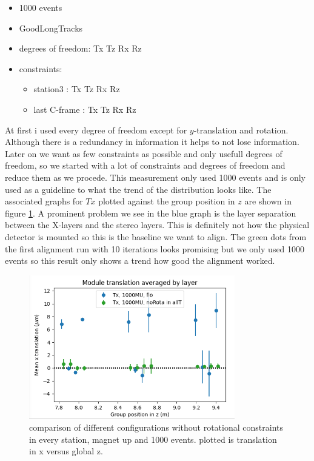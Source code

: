 \begin{itemize}
  \item 1000 events
  \item GoodLongTracks
  \item degrees of freedom: Tx Tz Rx Rz
  \item constraints:
  \begin{itemize}
    \item station3 : Tx Tz Rx Rz
    \item last C-frame : Tx Tz Rx Rz
  \end{itemize}
\end{itemize}

At first i used every degree of freedom except for $y$-translation and rotation. Although there is a redundancy in information it helps to not lose information. Later on we want as few constraints as possible and only usefull degrees of freedom, so we started with a lot of constraints and degrees of freedom and reduce them as we procede. This measurement only used 1000 events and is only used as a guideline to what the trend of the distribution looks like. The associated graphs for $Tx$ plotted against the group position in $z$ are shown in figure \ref{fig:june_2}.
A prominent problem we see in the blue graph is the layer separation between the X-layers and
the stereo layers. This is definitely not how the physical detector is mounted so this is the baseline we want to align.
The green dots from the first alignment run with 10 iterations looks promising
but we only used 1000 events so this result only shows a trend how good the alignment worked.

\begin{figure}
  \centering
  \includegraphics[width=0.8\textwidth]{plots/june_21/Tx_noRota_allT_1000MU.png}
  \caption{comparison of different configurations without rotational constraints in every station, magnet up and 1000 events. plotted is translation in x versus global z.}
  \label{fig:june_2}
\end{figure}

